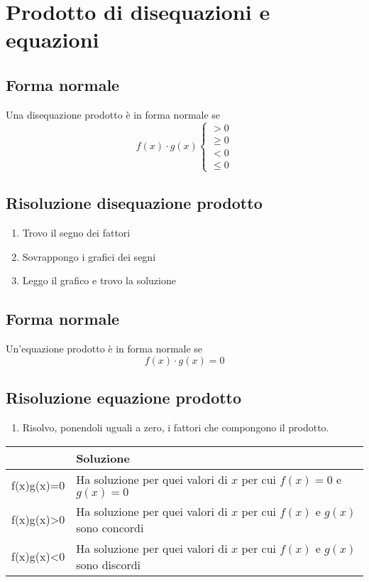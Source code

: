 \chapter{Prodotto di disequazioni e equazioni}
\section{Forma normale}
Una disequazione prodotto è in forma normale se
\begin{equation}
f(x)\cdot g(x)\begin{cases}
>0\\
\geq 0\\
<0\\
\leq 0
\end{cases}
\end{equation}
\section{Risoluzione disequazione prodotto}
\begin{enumerate}
	\item Trovo il segno dei fattori
	\item Sovrappongo i grafici dei segni
	\item Leggo il grafico e trovo la soluzione
\end{enumerate}
\section{Forma normale}
Un'equazione prodotto è in forma normale se
\begin{equation}
f(x)\cdot g(x)=0
\end{equation}
\section{Risoluzione equazione prodotto}
\begin{enumerate}
	\item Risolvo, ponendoli uguali a zero, i fattori che compongono il prodotto.
\end{enumerate}
\begin{center}
	\begin{tabular}{Cp{0.4\textwidth}}
		\toprule
		& Soluzione \\ 
		\midrule
		f(x)\cdot g(x)=0	& Ha soluzione per quei valori di $x$ per cui $f(x)=0$ e $g(x)= 0$  \\ 
		f(x)\cdot g(x)>0	& Ha soluzione per quei valori di $x$ per cui $f(x)$ e $g(x)$ sono concordi\\ 
	f(x)\cdot g(x)<0& Ha soluzione per quei valori di $x$ per cui $f(x)$ e $g(x)$ sono discordi\\ 
		\bottomrule
	\end{tabular}
\end{center}